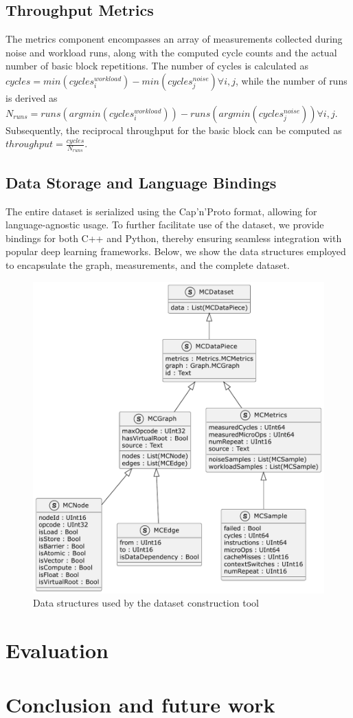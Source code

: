 \subsection{Throughput Metrics}

The metrics component encompasses an array of measurements collected during noise and workload runs, along with the computed cycle counts and the actual number of basic block repetitions. The number of cycles is calculated as
$cycles = min(cycles^{workload}_i) - min(cycles^{noise}_j) \forall i, j$, while the number of runs is derived as $N_{runs} = runs(argmin(cycles^{workload}_i)) - runs(argmin(cycles^{noise}_j)) \forall i, j$. Subsequently, the reciprocal throughput for the basic block can be computed as $throughput = \frac{cycles}{N_{runs}}$.

\subsection{Data Storage and Language Bindings}

The entire dataset is serialized using the Cap'n'Proto format, allowing for language-agnostic usage. To further facilitate use of the dataset, we provide bindings for both C++ and Python, thereby ensuring seamless integration with popular deep learning frameworks. Below, we show the data structures employed to encapsulate the graph, measurements, and the complete dataset.

\begin{figure}[h]
  \caption{Data structures used by the dataset construction tool}
  \centering
  \includegraphics[width=0.9\columnwidth]{data_structures}
\end{figure}

\section{Evaluation}


\section{Conclusion and future work}

